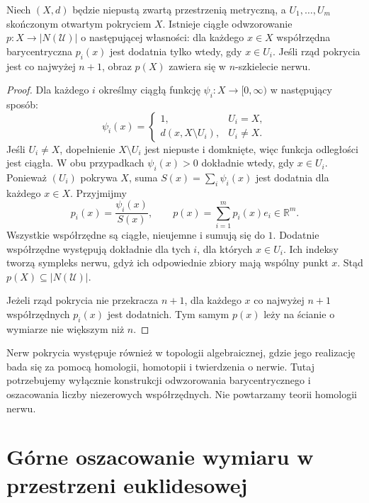 \begin{twierdzenie}
\label{thm:topog23-canonical-nerve}
Niech \((X,d)\) będzie niepustą
zwartą przestrzenią metryczną,
a \(U_1,\ldots,U_m\) skończonym otwartym
pokryciem \(X\).
Istnieje ciągłe odwzorowanie
\(p\colon X\to\lvert N(\mathcal U)\rvert\)
o następującej własności:
dla każdego \(x\in X\) współrzędna
barycentryczna \(p_i(x)\) jest dodatnia
tylko wtedy, gdy \(x\in U_i\).
Jeśli rząd pokrycia jest co najwyżej \(n+1\),
obraz \(p(X)\) zawiera się w \(n\)-szkielecie nerwu.
\end{twierdzenie}
\begin{proof}
Dla każdego \(i\) określmy
ciągłą funkcję \(\psi_i\colon X\to[0,\infty)\)
w następujący sposób:
\[
 \psi_i(x)=
 \begin{cases}
   1,&U_i=X,\\
   d(x,X\setminus U_i),&U_i\neq X.
 \end{cases}
\]
Jeśli \(U_i\neq X\), dopełnienie
\(X\setminus U_i\) jest niepuste i domknięte,
więc funkcja odległości jest ciągła.
W obu przypadkach
\(\psi_i(x)>0\) dokładnie wtedy, gdy \(x\in U_i\).
Ponieważ \((U_i)\) pokrywa \(X\),
suma \(S(x)=\sum_i\psi_i(x)\) jest dodatnia
dla każdego \(x\in X\).
Przyjmijmy
\[
 p_i(x)=\frac{\psi_i(x)}{S(x)},
 \qquad
 p(x)=\sum_{i=1}^m p_i(x)e_i\in\mathbb R^m.
\]
Wszystkie współrzędne są ciągłe,
nieujemne i sumują się do \(1\).
Dodatnie współrzędne występują dokładnie
dla tych \(i\), dla których \(x\in U_i\).
Ich indeksy tworzą sympleks nerwu,
gdyż ich odpowiednie zbiory
mają wspólny punkt \(x\).
Stąd \(p(X)\subseteq\lvert N(\mathcal U)\rvert\).

Jeżeli rząd pokrycia nie przekracza \(n+1\),
dla każdego \(x\) co najwyżej \(n+1\)
współrzędnych \(p_i(x)\) jest dodatnich.
Tym samym \(p(x)\) leży na ścianie
o wymiarze nie większym niż \(n\).
\end{proof}

\begin{uwaga}
\label{rem:topog23-nerve-overlap}
Nerw pokrycia występuje również
w topologii algebraicznej, gdzie
jego realizację bada się za pomocą
homologii, homotopii i twierdzenia o nerwie.
Tutaj potrzebujemy wyłącznie
konstrukcji odwzorowania barycentrycznego
i oszacowania liczby niezerowych współrzędnych.
Nie powtarzamy teorii homologii nerwu.
\end{uwaga}

\section{Górne oszacowanie wymiaru w przestrzeni euklidesowej}
\label{sec:topog23-euclidean}

